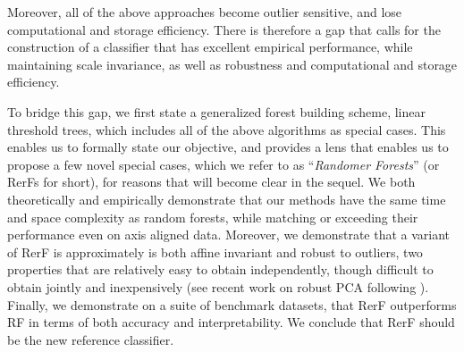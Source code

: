 \documentclass{article} %
\begin{document}

Moreover, all of the above approaches become outlier sensitive, and lose computational and storage efficiency.
There is therefore a gap that calls for the construction of a classifier that has excellent empirical performance, while maintaining scale invariance, as well as robustness and computational and storage efficiency.

To bridge this gap, we first state a generalized forest building scheme, linear threshold trees, which includes all of the above algorithms as special cases.  This enables us to formally state our objective, and provides a lens that enables us to propose a few novel special cases, which we refer to as ``{\em{Randomer Forests}}''  (or RerFs for short), for reasons that will become clear in the sequel.  We both theoretically and empirically demonstrate that our methods have the same time and space complexity as random forests, while matching or exceeding their performance even on axis aligned data.  Moreover, we demonstrate that a variant of RerF is approximately is both affine invariant and robust to outliers, two properties that are relatively easy to obtain independently, though difficult to obtain jointly and inexpensively (see recent work on robust PCA following \cite{Candes2009}). Finally, we demonstrate on a suite of benchmark datasets, that RerF outperforms RF in terms of both accuracy and interpretability.  We conclude that RerF should be the new reference classifier.
\end{document}
